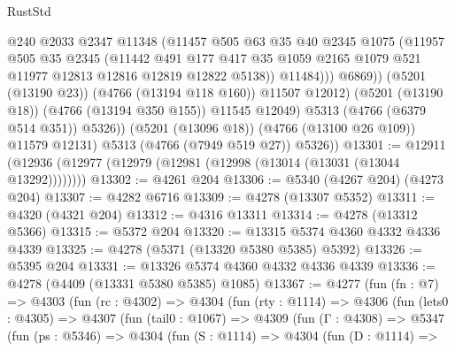 \begin{lexlean}{RustStd}
\begin{coremodule}
{\begin{coremodule}
{{{{{{{{{{{{{{{{{{{{{{{{{{{{{{{{{{{                          @240
                          @2033
                          @2347
                          @11348
                          (@11457
                            @505
                            @63
                            @35
                            @40
                            @2345
                            @1075
                            (@11957
                              @505
                              @35
                              @2345
                              (@11442
                                @491
                                @177
                                @417
                                @35
                                @1059
                                @2165
                                @1079
                                @521
                                @11977
                                @12813
                                @12816
                                @12819
                                @12822
                                @5138))
                            @11484)))
                      @6869))
                  (@5201 (@13190 @23))
                  (@4766 (@13194 @118 @160))
                  @11507
                  @12012)
                (@5201 (@13190 @18))
                (@4766 (@13194 @350 @155))
                @11545
                @12049)
              @5313
              (@4766 (@6379 @514 @351))
              @5326))
          (@5201 (@13096 @18))
          (@4766 (@13100 @26 @109))
          @11579
          @12131)
        @5313
        (@4766 (@7949 @519 @27))
        @5326))
@13301 := @12911 (@12936 (@12977 (@12979 (@12981 (@12998 (@13014 (@13031 (@13044 @13292))))))))
@13302 := @4261 @204
@13306 := @5340 (@4267 @204) (@4273 @204)
@13307 := @4282 @6716
@13309 := @4278 (@13307 @5352)
@13311 := @4320 (@4321 @204)
@13312 := @4316 @13311
@13314 := @4278 (@13312 @5366)
@13315 := @5372 @204
@13320 := @13315 @5374 @4360 @4332 @4336 @4339
@13325 := @4278 (@5371 (@13320 @5380 @5385) @5392)
@13326 := @5395 @204
@13331 := @13326 @5374 @4360 @4332 @4336 @4339
@13336 := @4278 (@4409 (@13331 @5380 @5385) @1085)
@13367 := @4277
    (fun (fn : @7) =>
    @4303
      (fun (rc : @4302) =>
      @4304
        (fun (rty : @1114) =>
        @4306
          (fun (lets0 : @4305) =>
          @4307
            (fun (tail0 : @1067) =>
            @4309
              (fun (Γ : @4308) =>
              @5347
                (fun (ps : @5346) =>
                @4304
                  (fun (S : @1114) =>
                  @4304
                    (fun (D : @1114) =>
}}}}}}}}}}}}}}}}}}}}}}}}}}}}}}}}}}}
\end{coremodule}}
\end{coremodule}
\end{lexlean}
